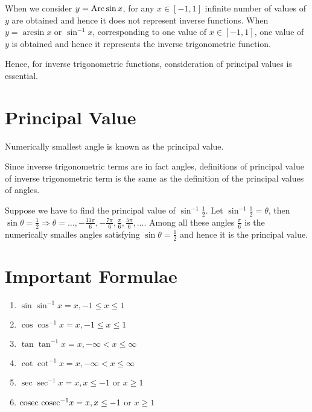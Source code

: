 When we consider $y = {\rm Arc}\sin x$, for any $x\in[-1, 1]$ infinite number of values of $y$ are obtained and hence it does not
represent inverse functions. When $y = \arcsin x$ or $\sin^{-1}x$, corresponding to one value of $x\in[-1, 1]$, one value of $y$ is
obtained and hence it represents the inverse trigonometric function.

Hence, for inverse trigonometric functions, consideration of principal values is essential.

\section{Principal Value}
Numerically smallest angle is known as the principal value.

Since inverse trigonometric terms are in fact angles, definitions of principal value of inverse trigonometric term is the same as
the definition of the principal values of angles.

Suppose we have to find the principal value of $\sin^{-1}\frac{1}{2}$. Let $\sin^{-1}\frac{1}{2} = \theta$, then $\sin\theta =
\frac{1}{2} \Rightarrow \theta = \ldots, -\frac{11\pi}{6}, -\frac{7\pi}{6}, \frac{\pi}{6}, \frac{5\pi}{6}, \ldots$. Among all these
angles $\frac{\pi}{6}$ is the numerically smalles angles satisfying $\sin\theta = \frac{1}{2}$ and hence it is the principal value.

\section{Important Formulae}
\begin{enumerate}
\item $\sin\sin^{-1}x = x, -1\leq x\leq 1$
\item $\cos\cos^{-1}x = x, -1\leq x\leq 1$
\item $\tan\tan^{-1}x = x, -\infty < x\leq\infty$
\item $\cot\cot^{-1}x = x, -\infty < x\leq\infty$
\item $\sec\sec^{-1}x = x, x\leq -1$ or $x\geq 1$
\item ${\rm cosec~cosec}^{-1}x = x, x\leq -1$ or $x\geq 1$
\end{enumerate}

